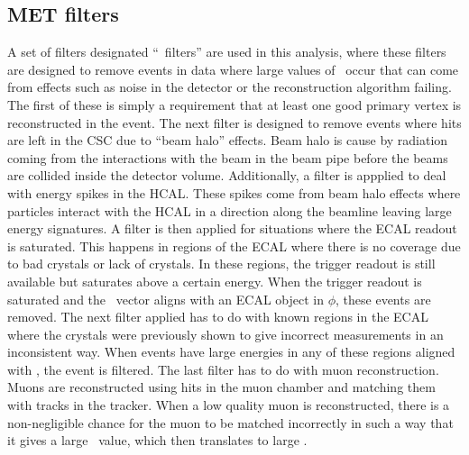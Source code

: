 \subsection{MET filters}
\label{ssec:metfilter}
A set of filters designated ``\MET\ filters'' are used in this analysis,
where these filters are designed to remove events in data where large values of \MET\
occur that can come from effects such as noise in the detector or the reconstruction algorithm failing.
The first of these is simply a requirement that at least one good primary vertex is reconstructed in the event.
The next filter is designed to remove events where hits are left in the CSC due to ``beam halo'' effects.
Beam halo is cause by radiation coming from the interactions with the beam in the beam pipe before the beams are collided inside the detector volume.
Additionally, a filter is appplied to deal with energy spikes in the HCAL.
These spikes come from beam halo effects where particles interact with the HCAL in a direction along the beamline leaving large energy signatures.
A filter is then applied for situations where the ECAL readout is saturated.
This happens in regions of the ECAL where there is no coverage due to bad crystals or lack of crystals.
In these regions, the trigger readout is still available but saturates above a certain energy.
When the trigger readout is saturated and the \MET\ vector aligns with an ECAL object in $\phi$, these events are removed.
The next filter applied has to do with known regions in the ECAL where the crystals were previously shown to give incorrect measurements in an inconsistent way.
When events have large energies in any of these regions aligned with \MET, the event is filtered.
The last filter has to do with muon reconstruction.
Muons are reconstructed using hits in the muon chamber and matching them with tracks in the tracker.
When a low quality muon is reconstructed,
there is a non-negligible chance for the muon to be matched incorrectly in such a way that it gives a large \pt\ value,
which then translates to large \MET.

